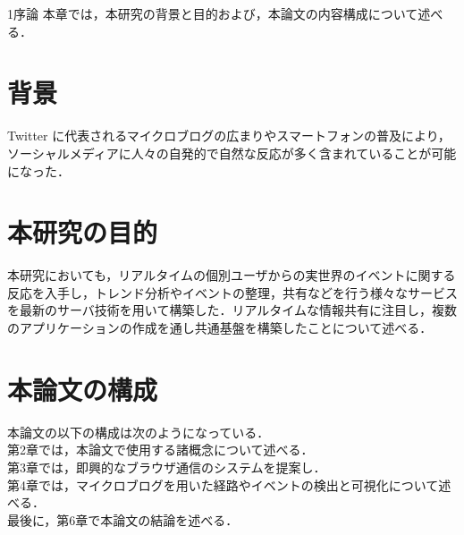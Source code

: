 \chapterhead
{1}{序論}
{本章では，本研究の背景と目的および，本論文の内容構成について述べる．}

\section{背景}
Twitter に代表されるマイクロブログの広まりやスマートフォンの普及により，ソーシャルメディアに人々の自発的で自然な反応が多く含まれていることが可能になった．


\section{本研究の目的}
本研究においても，リアルタイムの個別ユーザからの実世界のイベントに関する反応を入手し，トレンド分析やイベントの整理，共有などを行う様々なサービスを最新のサーバ技術を用いて構築した．リアルタイムな情報共有に注目し，複数のアプリケーションの作成を通し共通基盤を構築したことについて述べる．


\section{本論文の構成}
本論文の以下の構成は次のようになっている．\\
第2章では，本論文で使用する諸概念について述べる．\\
第3章では，即興的なブラウザ通信のシステムを提案し．\\
第4章では，マイクロブログを用いた経路やイベントの検出と可視化について述べる．\\
最後に，第6章で本論文の結論を述べる．\\
